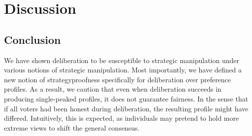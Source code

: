 \newpage
\chapter{Discussion}
\label{Discussion}


% 










\section{Conclusion}

We have shown deliberation to be susceptible to strategic manipulation under
various notions of strategic manipulation. Most importantly, we have defined a
new notion of strategyproofness specifically for deliberation over preference
profiles. As a result, we caution that even when deliberation succeeds in
producing single-peaked profiles, it does not guarantee fairness. In the sense
that if all voters had been honest during deliberation, the resulting profile
might have differed. Intuitively, this is expected, as individuals may pretend
to hold more extreme views to shift the general consensus.

